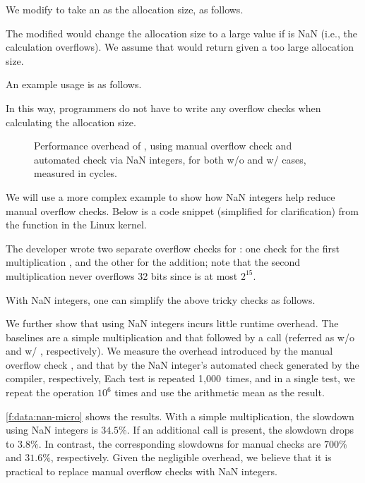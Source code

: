 We modify  to take an  as
the allocation size, as follows.

The modified  would change the allocation size to a large
value  if  is NaN (i.e., the calculation
overflows).  We assume that  would return
 given a too large allocation size.

An example usage is as follows.

In this way, programmers do not have to write any overflow checks
when calculating the allocation size.

\begin{figure}
\centering

\caption{Performance overhead of ,
using manual overflow check  and
automated check via NaN integers, for both w/o and w/ 
cases, measured in cycles.}
\label{f:data:nan-micro}
\end{figure}

We will use a more complex example to show how NaN integers
help reduce manual overflow checks.
%
Below is a code snippet (simplified for clarification) from the
 function in the Linux kernel.
%

%
The developer wrote two separate overflow checks for
:
one check for the first multiplication , and
the other for the addition;
note that the second multiplication 
never overflows 32 bits since  is at most $2^{15}$.

With NaN integers, one can simplify the above tricky checks as
follows. 


We further show that using NaN integers incurs little runtime
overhead.  The baselines are a simple multiplication  and
that followed by a  call (referred as w/o and w/
, respectively).  We measure the overhead introduced by
the manual overflow check , and
that by the NaN integer's automated check generated by the compiler,
respectively,
%
Each test is repeated 1,000~times, and in a single test, we repeat
the operation $10^6$ times and use the arithmetic mean as the result.

\autoref{f:data:nan-micro} shows the results.
%
With a simple multiplication, the slowdown using NaN integers is
$34.5\%$.  If an additional  call is present, the slowdown
drops to $3.8\%$.
%
In contrast, the corresponding slowdowns for manual checks
are $700\%$ and $31.6\%$, respectively.
%
Given the negligible overhead, we believe that it is practical
to replace manual overflow checks with NaN integers.

